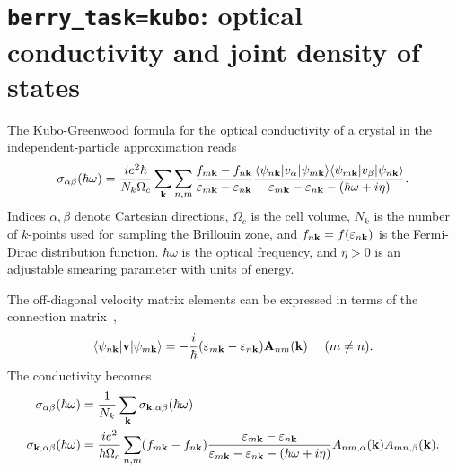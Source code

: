 \section{{\tt berry\_task=kubo}: optical conductivity and joint
  density of states }

The Kubo-Greenwood formula for the optical conductivity of a crystal
in the independent-particle approximation reads
%
\begin{equation}\label{eq:kubo}
\sigma_{\alpha\beta}(\hbar\omega)=\frac{ie^2\hbar}{N_k\Omega_c}
\sum_{\bf k}\sum_{n,m}
\frac{f_{m{\bf k}}-f_{n{\bf k}}}
     {\varepsilon_{m{\bf k}}-\varepsilon_{n{\bf k}}}
\frac{\langle\psi_{n{\bf k}}\vert v_\alpha\vert\psi_{m{\bf k}}\rangle
      \langle\psi_{m{\bf k}}\vert v_\beta\vert\psi_{n{\bf k}}\rangle}
{\varepsilon_{m{\bf k}}-\varepsilon_{n{\bf k}}-(\hbar\omega+i\eta)}.
\end{equation}
%
Indices $\alpha,\beta$ denote Cartesian directions, $\Omega_c$ is the
cell volume, $N_k$ is the number of $k$-points used for sampling the
Brillouin zone, and $f_{n{\bf k}}=f(\varepsilon_{n{\bf k}})$ is the
Fermi-Dirac distribution function. $\hbar\omega$ is the optical
frequency, and $\eta>0$ is an adjustable smearing parameter with units
of energy.

The off-diagonal velocity matrix elements can be expressed in terms of
the connection matrix~\cite{blount-ssp62},
%
\begin{equation}
\label{eq:velocity_mat}
\langle\psi_{n{\bf k}}\vert {\bf v} \vert\psi_{m{\bf k}}\rangle=
-\frac{i}{\hbar}(\varepsilon_{m{\bf k}}-\varepsilon_{n{\bf k}})
{\bf A}_{nm}({\bf k})\,\,\,\,\,\,\,\,(m\not= n).
\end{equation}
%
The conductivity becomes
%
\begin{align}
\label{eq:sig-bz}
\sigma_{\alpha\beta}(\hbar\omega)&=
\frac{1}{N_k}\sum_{\bf k}\sigma_{{\bf k},\alpha\beta}(\hbar\omega)\\
\label{eq:sig-k}
\sigma_{{\bf k},\alpha\beta}(\hbar\omega)&=\frac{ie^2}{\hbar\Omega_c}\sum_{n,m}
(f_{m{\bf k}}-f_{n{\bf k}})
\frac{\varepsilon_{m{\bf k}}-\varepsilon_{n{\bf k}}}
{\varepsilon_{m{\bf k}}-\varepsilon_{n{\bf k}}-(\hbar\omega+i\eta)}
A_{nm,\alpha}({\bf k})A_{mn,\beta}({\bf k}).
\end{align}

